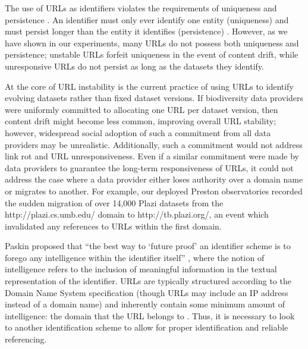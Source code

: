 The use of URLs as identifiers violates the requirements of uniqueness and persistence \citep{Paskin_1999}. An identifier must only ever identify one entity (uniqueness) and must persist longer than the entity it identifies (persistence) \citep{Paskin_1999}. However, as we have shown in our experiments, many URLs do not possess both uniqueness and persistence; unstable URLs forfeit uniqueness in the event of content drift, while unresponsive URLs do not persist as long as the datasets they identify.

At the core of URL instability is the current practice of using URLs to identify evolving datasets rather than fixed dataset versions. If biodiversity data providers were uniformly committed to allocating one URL per dataset version, then content drift might  become less common, improving overall URL stability; however, widespread social adoption of such a commitment from all data providers may be unrealistic. Additionally, such a commitment would not address link rot and URL unresponsiveness. Even if a similar commitment were made by data providers to guarantee the long-term responsiveness of URLs, it could not address the case where a data provider either loses authority over a domain name or migrates to another. For example, our deployed Preston observatories recorded the sudden migration of over 14,000 Plazi datasets from the http://plazi.cs.umb.edu/ domain to http://tb.plazi.org/, an event which invalidated any references to URLs within the first domain.

Paskin proposed that ``the best way to `future proof' an identifier scheme is to forego any intelligence within the identifier itself'' \citep{Paskin_1999}, where the notion of intelligence refers to the inclusion of meaningful information in the textual representation of the identifier. URLs are typically structured according to the Domain Name System specification (though URLs may include an IP address instead of a domain name) and inherently contain some minimum amount of intelligence: the domain that the URL belongs to \citep{rfc1034}. Thus, it is necessary to look to another identification scheme to allow for proper identification and reliable referencing.

